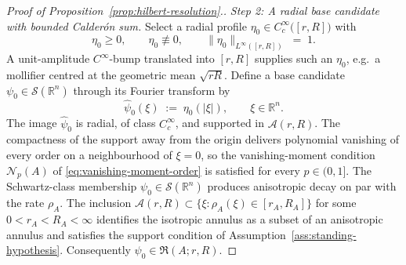 \documentclass[pdflatex,sn-basic,Numbered]{sn-jnl}
\theoremstyle{thmstyleone}%
\theoremstyle{thmstylethree}%
\begin{document}
\begin{proof}[Proof of Proposition~\ref{prop:hilbert-resolution}.]
	\medskip
	\emph{Step 2: A radial base candidate with bounded Calder\'on sum.}
	Select a radial profile $\eta_0 \in C^\infty_c\bigl([r, R]\bigr)$
	with
	\begin{equation}\label{eq:eta0-prescription}
		\eta_0 \ge 0,
		\qquad
		\eta_0 \not\equiv 0,
		\qquad
		\| \eta_0 \|_{L^\infty([r, R])} \;=\; 1 .
	\end{equation}
	A unit-amplitude $C^\infty$-bump translated into $[r, R]$ supplies
	such an $\eta_0$, e.g.\ a mollifier centred at the geometric mean
	$\sqrt{rR}$. Define a base candidate
	$\psi_0 \in \mathcal{S}(\mathbb{R}^n)$ through its Fourier transform
	by
	\begin{equation}\label{eq:psi0-defn}
		\widehat{\psi}_0(\xi) \;:=\; \eta_0(|\xi|),
		\qquad \xi \in \mathbb{R}^n .
	\end{equation}
	The image $\widehat{\psi}_0$ is radial, of class $C^\infty_c$, and
	supported in $\mathcal{A}(r, R)$. The compactness of the support
	away from the origin delivers polynomial vanishing of every order
	on a neighbourhood of $\xi = 0$, so the vanishing-moment condition
	$\mathcal{N}_p(A)$ of \eqref{eq:vanishing-moment-order} is satisfied
	for every $p \in (0, 1]$. The Schwartz-class membership
	$\psi_0 \in \mathcal{S}(\mathbb{R}^n)$ produces anisotropic decay
	on par with the rate $\rho_A$. The inclusion
	$\mathcal{A}(r, R) \subset \{ \xi : \rho_A(\xi) \in [r_A, R_A] \}$
	for some $0 < r_A < R_A < \infty$ identifies the isotropic annulus
	as a subset of an anisotropic annulus and satisfies the support
	condition of Assumption~\ref{ass:standing-hypothesis}.
	Consequently $\psi_0 \in \mathfrak{R}(A; r, R)$.
	

\end{proof}
\end{document}
